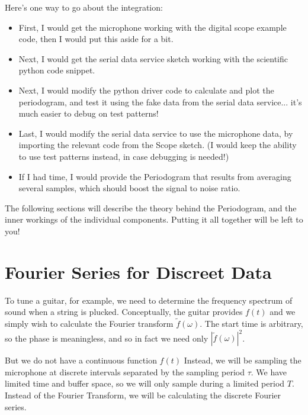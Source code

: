 \documentclass[12pt]{article}
\begin{document}
Here's one way to go about the integration:  
\begin{itemize}
\item First, I would get the microphone working with the digital scope example code, then I would put this aside for a bit.
\item Next, I would get the serial data service sketch working with the scientific python code snippet.
\item Next, I would modify the python driver code to calculate and plot the periodogram, and test it using the fake data from the serial data service... it's much easier to debug on test patterns!
\item Last, I would modify the serial data service to use the microphone data, by importing the relevant code from the Scope sketch.  (I would keep the ability to use test patterns instead, in case debugging is needed!)
\item If I had time, I would provide the Periodogram that results from averaging several samples, which should boost the signal to noise ratio.
\end{itemize}
The following sections will describe the theory behind the Periodogram, and the inner workings of the individual components.  Putting it all together will be left to you!

\section{Fourier Series for Discreet Data}

To tune a guitar, for example, we need to determine the frequency spectrum of sound when a string is plucked.   Conceptually, the guitar provides $f(t)$ and we simply wish to calculate the Fourier transform $\widetilde{f}(\omega)$.  The start time is arbitrary, so the phase is meaningless, and so in fact we need only 
$|\widetilde{f}(\omega)|^2$.

But we do not have a continuous function $f(t)$   Instead, we will be sampling the microphone at discrete intervals separated by the sampling period $\tau$.  We have limited time and buffer space, so we will only sample during a limited period $T$.  Instead of the Fourier Transform, we will be calculating the discrete Fourier series.
\end{document}

